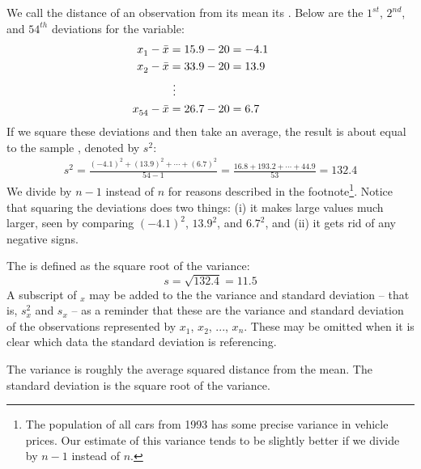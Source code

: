 We call the distance of an observation from its mean its . Below are the $1^{st}_{}$, $2^{nd}_{}$, and $54^{th}_{}$ deviations for the  variable:
\begin{align*}
x_1^{}-\bar{x} &= 15.9-20 = -4.1 \hspace{5mm}\text{ } \\
x_2^{}-\bar{x} &= 33.9-20 = 13.9 \\
			&\ \vdots \\
x_{54}^{}-\bar{x} &= 26.7-20 = 6.7
\end{align*}
If we square these deviations and then take an average, the result is about equal to the sample \label{varianceIsDefined}, denoted by $s_{}^2$:
\begin{eqnarray*}
s_{}^2 = \frac{(-4.1)_{}^2 + (13.9)_{}^2 + \cdots + (6.7)_{}^2}{54-1} = \frac{16.8 + 193.2 + \cdots + 44.9}{53} = 132.4
\end{eqnarray*}
We divide by $n-1$ instead of $n$ for reasons described in the footnote\footnote{The population of all cars from 1993 has some precise variance in vehicle prices. Our estimate of this variance tends to be slightly better if we divide by $n-1$ instead of $n$.}. Notice that squaring the deviations does two things: (i) it makes large values much larger, seen by comparing $(-4.1)^2$, $13.9^2$, and $6.7^2$, and (ii) it gets rid of any negative signs.

The  is defined as the square root of the variance:
$$s=\sqrt{132.4} = 11.5$$
A subscript of $_x$ may be added to the the variance and standard deviation -- that is, $s_x^2$ and $s_x^{}$ -- as a reminder that these are the variance and standard deviation of the observations represented by $x_1^{}$, $x_2^{}$, ..., $x_n^{}$. These may be omitted when it is clear which data the standard deviation is referencing.

\begin{termBox}{
The variance is roughly the average squared distance from the mean. The standard deviation is the square root of the variance.}
\end{termBox}

